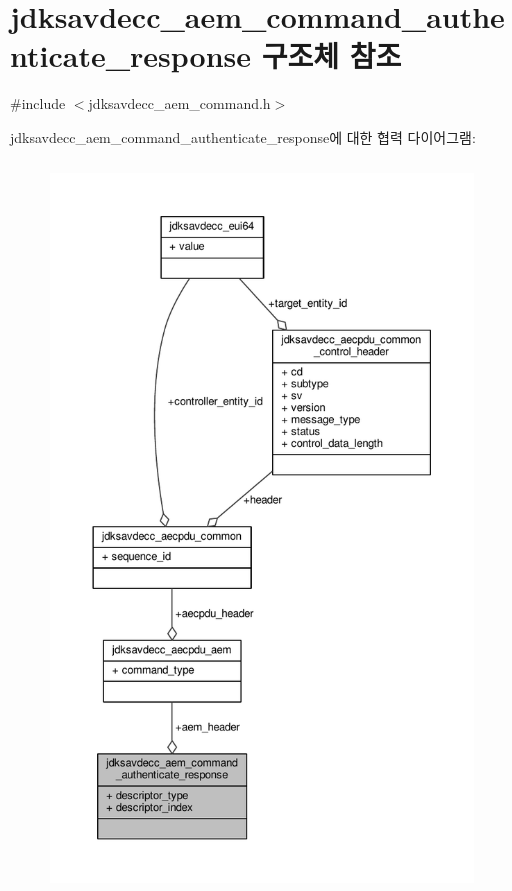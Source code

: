 \hypertarget{structjdksavdecc__aem__command__authenticate__response}{}\section{jdksavdecc\+\_\+aem\+\_\+command\+\_\+authenticate\+\_\+response 구조체 참조}
\label{structjdksavdecc__aem__command__authenticate__response}


{\ttfamily \#include $<$jdksavdecc\+\_\+aem\+\_\+command.\+h$>$}



jdksavdecc\+\_\+aem\+\_\+command\+\_\+authenticate\+\_\+response에 대한 협력 다이어그램\+:
\nopagebreak
\begin{figure}[H]
\begin{center}
\leavevmode
\includegraphics[height=550pt]{structjdksavdecc__aem__command__authenticate__response__coll__graph}
\end{center}
\end{figure}
